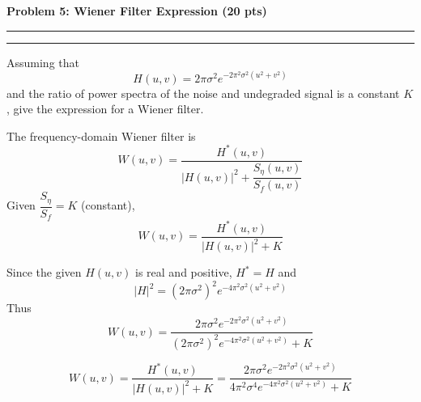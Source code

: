 \documentclass[12pt]{article}
\newcommand{\question}[1]{%
  \clearpage
  \vspace{0.5cm}
  {\noindent\normalsize \textbf{#1}}
  \vspace{0.2cm}
  \hrule
  \vspace{0.1cm}
  \hrule
  \vspace{0.3cm}
}
\begin{document}
\question{Problem 5: Wiener Filter Expression (20 pts)}\label{quest:5}

Assuming that
\[
H(u,v) = 2\pi\sigma^{2} e^{-2\pi^{2}\sigma^{2}(u^{2}+v^{2})}
\]
and the ratio of power spectra of the noise and undegraded signal is a constant $K$,
give the expression for a Wiener filter.

\vspace{0.4cm}

\begin{stepbox}
The frequency-domain Wiener filter is
\[
W(u,v)=\frac{H^*(u,v)}{|H(u,v)|^2 + \dfrac{S_\eta(u,v)}{S_f(u,v)}}
\]
Given $\dfrac{S_\eta}{S_f}=K$ (constant),
\[
W(u,v)=\frac{H^*(u,v)}{|H(u,v)|^2 + K}
\]
\end{stepbox}

\begin{stepbox}
Since the given $H(u,v)$ is real and positive, $H^*=H$ and
\[
|H|^2 = \left(2\pi\sigma^2\right)^2 e^{-4\pi^2\sigma^2(u^2+v^2)}
\]
Thus
\[
W(u,v)=
\frac{2\pi\sigma^2 e^{-2\pi^2\sigma^2(u^2+v^2)}}{
\left(2\pi\sigma^2\right)^2 e^{-4\pi^2\sigma^2(u^2+v^2)} + K}
\]
\end{stepbox}

\begin{resultsbox}
\[
\boxed{W(u,v)=\frac{H^*(u,v)}{|H(u,v)|^2+K}
=\frac{2\pi\sigma^2 e^{-2\pi^2\sigma^2(u^2+v^2)}}{
4\pi^2\sigma^4 e^{-4\pi^2\sigma^2(u^2+v^2)}+K}}
\]
\end{resultsbox}


\end{document}
